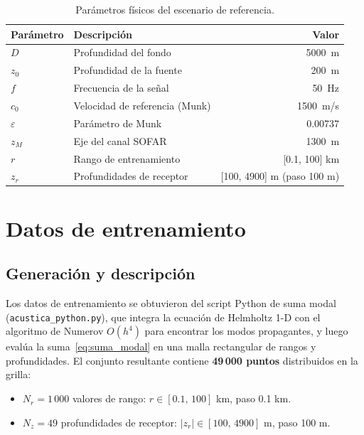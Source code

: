\documentclass[12pt,a4paper]{article}
\begin{document}
\begin{table}[H]
\centering
\caption{Parámetros físicos del escenario de referencia.}
\label{tab:parametros}
\begin{tabular}{llr}
\toprule
Parámetro & Descripción & Valor \\
\midrule
$D$              & Profundidad del fondo           & \SI{5000}{m}          \\
$z_0$            & Profundidad de la fuente        & \SI{200}{m}           \\
$f$              & Frecuencia de la señal          & \SI{50}{Hz}           \\
$c_0$            & Velocidad de referencia (Munk)  & \SI{1500}{m/s}        \\
$\varepsilon$    & Parámetro de Munk               & 0.00737               \\
$z_M$            & Eje del canal SOFAR             & \SI{1300}{m}          \\
$r$              & Rango de entrenamiento          & [0.1, 100] km         \\
$z_r$            & Profundidades de receptor       & [100, 4900] m (paso 100 m) \\
\bottomrule
\end{tabular}
\end{table}

\section{Datos de entrenamiento}

\subsection{Generación y descripción}

Los datos de entrenamiento se obtuvieron del script Python de suma modal
(\texttt{acustica\_python.py}), que integra la ecuación de Helmholtz 1-D con
el algoritmo de Numerov $O(h^4)$ para encontrar los modos propagantes, y luego
evalúa la suma~\eqref{eq:suma_modal} en una malla rectangular de rangos y
profundidades. El conjunto resultante contiene \textbf{49\,000 puntos}
distribuidos en la grilla:

\begin{itemize}[nosep]
  \item $N_r = 1\,000$ valores de rango: $r \in [0.1,\,100]$ km, paso 0.1 km.
  \item $N_z = 49$ profundidades de receptor: $|z_r| \in [100,\,4900]$ m,
        paso 100 m.
\end{itemize}
\end{document}
